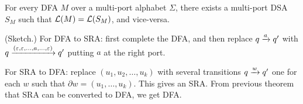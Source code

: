 \begin{theorem}
 For every DFA $M$ over a multi-port alphabet $\Sigma$, there exists
 a multi-port DSA $S_M$ such that $\mathcal{L}(M) = \mathcal{L}(S_M)$, and
 vice-versa.
\end{theorem}
\begin{IEEEproof} (Sketch.) For DFA to SRA: first complete the DFA, and
 then replace $q \xrightarrow{a} q'$ with
 $q \xrightarrow{(\varepsilon, \varepsilon, \dots, a, \dots, \varepsilon)} q'$ putting $a$ at the right
 port.%

 For SRA to DFA: replace $(u_1, u_2, \dots, u_k)$ with several
 transitions $q \xrightarrow{w} q'$ one for each $w$ such that
 $\partial w = (u_1, \dots, u_k)$. This gives an SRA. From previous
 theorem that SRA can be converted to DFA, we get DFA.%

\end{IEEEproof}%






